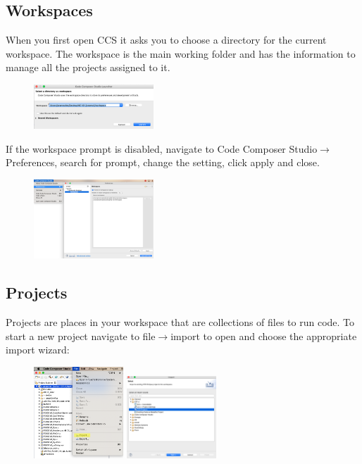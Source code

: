 \documentclass{article}
\begin{document}
\subsection{Workspaces}

When you first open CCS it asks you to choose a directory for the current workspace. The workspace is the main working folder and has the information to manage all the projects assigned to it.

\begin{figure}[H]
    \centering
    \includegraphics[width = 0.4\textwidth]{ccs_workspaces_1} 
\end{figure}

If the workspace prompt is disabled, navigate to Code Composer Studio$\rightarrow$Preferences, search for prompt, change the setting, click apply and close.

\begin{figure}[H]
    \centering
    \includegraphics[width = 0.4\textwidth]{ccs_workspaces_2} 
\end{figure}

\pagebreak

\subsection{Projects}

Projects are places in your workspace that are collections of files to run code. To start a new project navigate to file$\rightarrow$import to open and choose the appropriate import wizard:

\begin{figure}[H]
    \centering
  \includegraphics[width = 0.3\textwidth]{ccs_projects_1} 
  \qquad
    \includegraphics[width = 0.3\textwidth]{ccs_projects_2} 
\end{figure}
\end{document}
